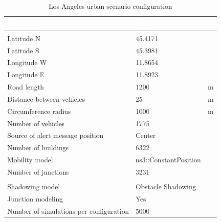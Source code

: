 		\begin{table}[H]
			\def\arraystretch{1.1}
			\begin{tabularx}{\textwidth}{l | l  l}
				\rowcolor{I} {\large \textcolor{white}{Parameter}} & {\large \textcolor{white}{Value}} & {\large \textcolor{white}{}} \TBstrut  \\
				\toprule
				\endhead
				\rowcolor{P} \multicolumn{3}{c}{Scenario configuration} \\
				\midrule[1pt]
				Latitude N								& 45.4171				& \textdegree		\\
				Latitude S								& 45.3981				& \textdegree		\\
				Longitude W								& 11.8654				& \textdegree		\\
				Longitude E								& 11.8923				& \textdegree		\\
				Road length 							& 1200	 				& m		\\
				Distance between vehicles 				& 25					& m		\\
				Circumference radius					& 1000					& m		\\
				Number of vehicles						& 1775					& 		\\
				Source of alert message position		& Center				&		\\
				Number of buildings						& 6322					&		\\
				Mobility model							& ns3::ConstantPosition	&		\\
				Number of junctions						& 3231					&		\\	
				\midrule[1pt]
				\rowcolor{P} \multicolumn{3}{c}{Network configuration} \\
				\midrule[1pt]
				Shadowing model							& Obstacle Shadowing 	&		\\
				Junction modeling						& Yes					&		\\
				\midrule[1pt]
				Number of simulations per configuration	& 5000					&		\\
				\bottomrule
			\end{tabularx}
			\caption{Los Angeles urban scenario configuration}
			\label{tab:padua-25}
		\end{table}

